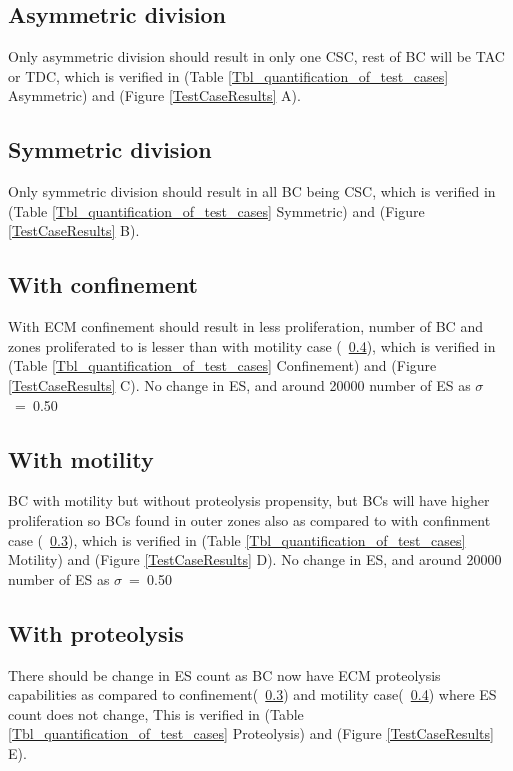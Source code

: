   
\subsection{Asymmetric division}
Only asymmetric division should result in only one CSC, rest of BC will be TAC or TDC, 
which is verified in (Table \ref{Tbl_quantification_of_test_cases} Asymmetric) and (Figure \ref{TestCaseResults} A).

\subsection{Symmetric division}
Only symmetric division should result in all BC being CSC, 
which is verified in (Table \ref{Tbl_quantification_of_test_cases} Symmetric) and (Figure \ref{TestCaseResults} B).
  
\subsection{With confinement}
\label{withConfinementTestCase}
With ECM confinement should result in less proliferation, number of BC and zones proliferated to is lesser than with motility case (~\ref{withMotilityTestCase}), 
which is verified in (Table \ref{Tbl_quantification_of_test_cases} Confinement) and (Figure \ref{TestCaseResults} C). 
No change in ES, and around 20000 number of ES as $\sigma$\ =\ 0.50 

\subsection{With motility}  
\label{withMotilityTestCase}
BC with motility but without proteolysis propensity, 
but BCs will have higher proliferation so BCs found in outer zones also as compared to with confinment case (~\ref{withConfinementTestCase}), 
which is verified in (Table \ref{Tbl_quantification_of_test_cases} Motility) and (Figure \ref{TestCaseResults} D).
No change in ES, and around 20000 number of ES as $\sigma$\ =\ 0.50
  
\subsection{With proteolysis}  
\label{withProteolysisTestCase}
There should be change in ES count as BC now have ECM proteolysis capabilities as 
compared to confinement(~\ref{withConfinementTestCase}) and motility case(~\ref{withMotilityTestCase}) where ES count does not change, 
This is verified in (Table \ref{Tbl_quantification_of_test_cases} Proteolysis) and (Figure \ref{TestCaseResults} E).

